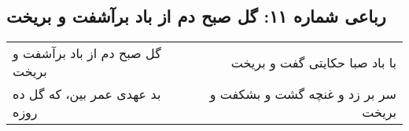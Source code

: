 \begin{center}
\section*{رباعی شماره ۱۱: گل صبح دم از باد برآشفت و بریخت}
\label{sec:011}
\begin{longtable}{l p{0.5cm} r}
گل صبح دم از باد برآشفت و بریخت
&&
با باد صبا حکایتی گفت و بریخت
\\
بد عهدی عمر بین، که گل ده روزه
&&
سر بر زد و غنچه گشت و بشکفت و بریخت
\\
\end{longtable}
\end{center}
